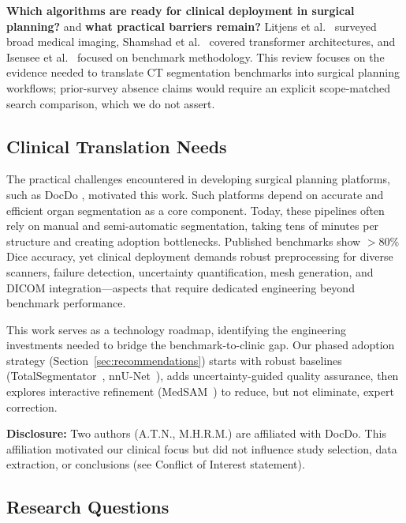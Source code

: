 \textbf{Which algorithms are ready for clinical deployment in surgical planning?}  and \textbf{what practical barriers remain?} Litjens et al.\ \cite{litjens2017survey} surveyed broad medical imaging, Shamshad et al.\ \cite{shamshad2023transformers} covered transformer architectures, and Isensee et al.\ \cite{isensee2021nnunet} focused on benchmark methodology. This review focuses on the evidence needed to translate CT segmentation benchmarks into surgical planning workflows; prior-survey absence claims would require an explicit scope-matched search comparison, which we do not assert.

\subsection{Clinical Translation Needs}

The practical challenges encountered in developing surgical planning platforms, such as DocDo \cite{docdo2026}, motivated this work. Such platforms depend on accurate and efficient organ segmentation as a core component. Today, these pipelines often rely on manual and semi-automatic segmentation, taking tens of minutes per structure and creating adoption bottlenecks. Published benchmarks show $>$80\% Dice accuracy, yet clinical deployment demands robust preprocessing for diverse scanners, failure detection, uncertainty quantification, mesh generation, and DICOM integration---aspects that require dedicated engineering beyond benchmark performance.

This work serves as a technology roadmap, identifying the engineering investments needed to bridge the benchmark-to-clinic gap. Our phased adoption strategy (Section~\ref{sec:recommendations}) starts with robust baselines (TotalSegmentator~\cite{wasserthal2023totalsegmentator}, nnU-Net~\cite{isensee2021nnunet}), adds uncertainty-guided quality assurance, then explores interactive refinement (MedSAM~\cite{ma2024medsam}) to reduce, but not eliminate, expert correction.

\textbf{Disclosure:} Two authors (A.T.N., M.H.R.M.) are affiliated with DocDo. This affiliation motivated our clinical focus but did not influence study selection, data extraction, or conclusions (see Conflict of Interest statement).

\subsection{Research Questions}

